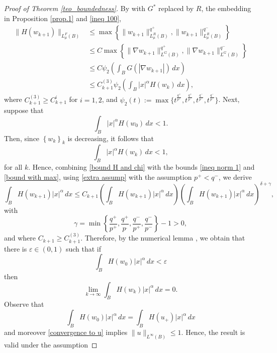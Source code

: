 \documentclass[leqno,twoside, 12pt]{amsart}
\theoremstyle{plain}
\numberwithin{equation}{section} \numberwithin{figure}{section}
\theoremstyle{definition}
\numberwithin{equation}{section}
\begin{document}
\begin{proof}[Proof of Theorem \ref{teo_boundedness}]
 By \cite[Lemma 10]{FSV} with $G^{*}$ replaced by $R$, the embedding in Proposition \ref{prop.1} and \eqref{ineq 100},
\begin{equation}\label{bound with max}
\begin{split}
\|H(w_{k+1})\|_{L_{\mu}^F(B)} & \leq \max\left\lbrace \|w_{k+1}\|_{L^R_\mu(B)}^{q^{+}},\|w_{k+1}\|_{L^R_\mu(B)}^{q^{-}}\right\rbrace \\& \leq C\max\left\lbrace \|\nabla w_{k+1}\|_{L^G(B)}^{q^{+}},\|\nabla w_{k+1}\|_{L^G(B)}^{q^{-}}\right\rbrace \\ & \leq C \psi_2\left(\int_B G(|\nabla w_{k+1}|)\,dx \right)\\
& \leq C^{(3)}_{k+1} \psi_2\left(\int_B |x|^\alpha H(w_k)\,dx\right),
\end{split}
\end{equation}where $C^{(3)}_{k+1}\geq C^{i}_{k+1}$ for $i=1, 2$, and  $\psi_2(t):=\max\{t^\frac{q^+}{p^+}, t^\frac{q^+}{p^-}, t^\frac{q^-}{p^-}, t^\frac{q^-}{p^-}\}$.  Next, suppose that
\begin{equation}
\int_B |x|^\alpha H(w_0)\,dx < 1.
\end{equation}Then, since $\left\lbrace w_{k} \right\rbrace_k $ is decreasing, it follows that
\begin{equation}\label{extra assump}
\int_B |x|^\alpha H(w_k)\,dx<1,
\end{equation}for all $k$. Hence, combining  \eqref{bound H and chi} with the bounds \eqref{ineq norm 1} and \eqref{bound with max}, using \eqref{extra assump} with the assumption $p^{+}<q^{-}$, we derive
 \begin{equation}
 \int_B H(w_{k+1})|x|^{\alpha}\,dx \leq C_{k+1} \left(\int_B H(w_{k+1})|x|^{\alpha}\,dx\right)\left( \int_B H(w_{k+1})|x|^{\alpha}\,dx\right)^{\delta+\gamma},
 \end{equation}with
 $$\gamma = \min\left\lbrace \dfrac{q^{+}}{p^{+}},\dfrac{q^{+}}{p^{.}}, \dfrac{q^{-}}{p^{+}}, \dfrac{q^{-}}{p^{-}}\right\rbrace -1>0,$$and where $C_{k+1}\geq C^{(3)}_{k+1}$. Therefore, by the numerical lemma \cite[Lemma 13]{FSV}, we obtain that there is $\varepsilon\in (0, 1)$ such that if
 \begin{equation}\label{assumption with eps}
 \int_B H(w_0)|x|^\alpha\,dx<\varepsilon
 \end{equation}then
 $$\lim_{k\to \infty} \int_B H(w_{k})|x|^{\alpha}\,dx =0.$$Observe that 
 $$\int_B H(w_0)|x|^\alpha\,dx=\int_B H(u_{+})|x|^\alpha\,dx$$and moreover \eqref{convergence to u} implies  $\|u\|_{L^{\infty}(B)}\leq 1$. Hence, the result is valid under the assumption

\end{proof}
\end{document}
